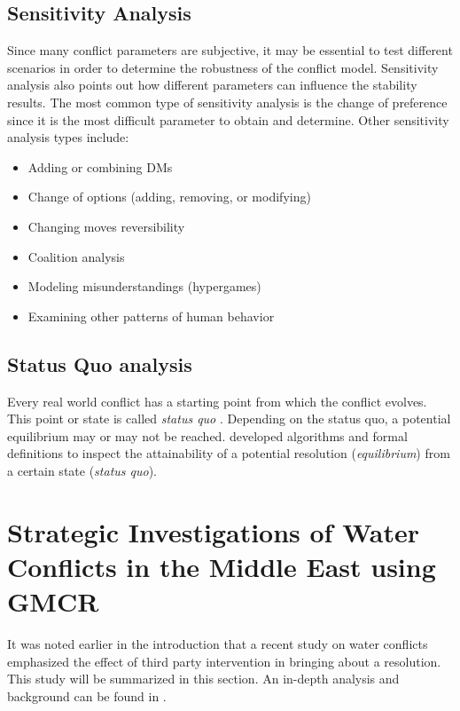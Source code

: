 \documentclass[letterpaper,12pt,titlepage,oneside,final]{book}
\begin{document}
\subsection{Sensitivity Analysis}

Since many conflict parameters are subjective, it may be essential to test different scenarios in order to determine the robustness of the conflict model. Sensitivity analysis also points out how different parameters can influence the stability results. The most common type of sensitivity analysis is the change of preference since it is the most difficult parameter to obtain and determine. Other sensitivity analysis types include:

\begin{itemize}
\item Adding or combining DMs
\item Change of options (adding, removing, or modifying) 
\item Changing moves reversibility
\item Coalition analysis
\item Modeling misunderstandings (hypergames)
\item Examining other patterns of human behavior
\end{itemize}


\subsection{Status Quo analysis}

Every real world conflict has a starting point from which the conflict evolves. This point or state is called \emph{status quo} \citep{fang1993}. Depending on the status quo, a potential equilibrium may or may not be reached. \citet{li2004squo,li2005squo} developed algorithms and formal definitions to inspect the attainability of a potential resolution (\emph{equilibrium}) from a certain state (\emph{status quo}).

\section{Strategic Investigations of Water Conflicts in the Middle East using GMCR}
\label{sec:example1}
It was noted earlier in the introduction that a recent study on water conflicts emphasized the effect of third party intervention in bringing about a resolution. This study will be summarized in this section. An in-depth analysis and background can be found in \citet{HipelRami}.
\end{document}
